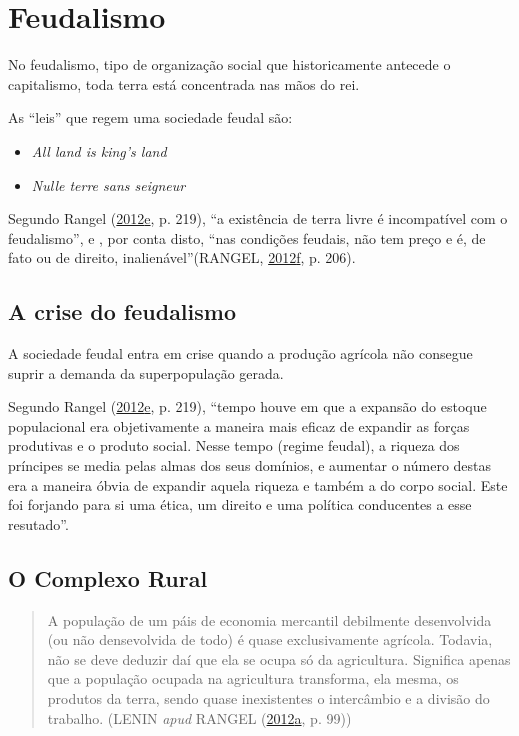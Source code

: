 \documentclass[a4paper, 12pt]{article}
\providecommand{\tightlist}{%
  \setlength{\itemsep}{0pt}\setlength{\parskip}{0pt}}
\begin{document}
\hypertarget{feudalismo}{%
\section{Feudalismo}\label{feudalismo}}

No feudalismo, tipo de organização social que historicamente antecede o
capitalismo, toda terra está concentrada nas mãos do rei.

As ``leis'' que regem uma sociedade feudal são:

\begin{itemize}
\tightlist
\item
  \emph{All land is king's land}
\item
  \emph{Nulle terre sans seigneur}
\end{itemize}

Segundo Rangel
(\protect\hyperlink{ref-rangel1961}{2012}\protect\hyperlink{ref-rangel1961}{e},
p. 219), ``a existência de terra livre é incompatível com o
feudalismo'', e , por conta disto, ``nas condições feudais, não tem
preço e é, de fato ou de direito, inalienável''(RANGEL,
\protect\hyperlink{ref-rangel1960}{2012}\protect\hyperlink{ref-rangel1960}{f},
p. 206).

\hypertarget{a-crise-do-feudalismo}{%
\subsection{A crise do feudalismo}\label{a-crise-do-feudalismo}}

A sociedade feudal entra em crise quando a produção agrícola não
consegue suprir a demanda da superpopulação gerada.

Segundo Rangel
(\protect\hyperlink{ref-rangel1961}{2012}\protect\hyperlink{ref-rangel1961}{e},
p. 219), ``tempo houve em que a expansão do estoque populacional era
objetivamente a maneira mais eficaz de expandir as forças produtivas e o
produto social. Nesse tempo (regime feudal), a riqueza dos príncipes se
media pelas almas dos seus domínios, e aumentar o número destas era a
maneira óbvia de expandir aquela riqueza e também a do corpo social.
Este foi forjando para si uma ética, um direito e uma política
conducentes a esse resutado''.

\hypertarget{o-complexo-rural}{%
\subsection{O Complexo Rural}\label{o-complexo-rural}}

\begin{quote}
A população de um páis de economia mercantil debilmente desenvolvida (ou
não densevolvida de todo) é quase exclusivamente agrícola. Todavia, não
se deve deduzir daí que ela se ocupa só da agricultura. Significa apenas
que a população ocupada na agricultura transforma, ela mesma, os
produtos da terra, sendo quase inexistentes o intercâmbio e a divisão do
trabalho. (LENIN \emph{apud} RANGEL
(\protect\hyperlink{ref-rangel1954}{2012}\protect\hyperlink{ref-rangel1954}{a},
p. 99))
\end{quote}
\end{document}
